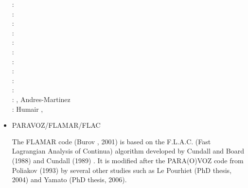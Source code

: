 \begin{itemize}
\begin{scriptsize}
\twothousandeight: \cite{daks08}\cite{scdk08}\\
\twothousandnine: \cite{gogk09}\\
\twothousandten: \cite{krda10}\cite{kaus10}\cite{dekc10}\\
\twothousandeleven: \cite{yakm11}\\
\twothousandtwelve: \cite{gebk12}\cite{rukb12}\cite{thka12}\\
\twothousandthirteen: \cite{scpo13}\\
\twothousandfourteen: \cite{jobk14}\\
\twothousandfifteen: \cite{lukz15}\cite{gehm15}\cite{thkp15}\cite{musd15}\\
\twothousandsixteen: \cite{jads16}\cite{maka16}\cite{cakp16}\\
\twothousandeighteen: \cite{dusd18}\cite{jasc18}\cite{jadg18}\cite{comj18}\cite{jens18}\cite{rabw18}\cite{chsm18}\\
\twothousandnineteen: \cite{sifg19}\cite{baba19}\cite{sogh19}, Andres-Martinez \etal \cite{anpa19}\\
\twothousandtwenty: Humair \etal \cite{hube20},
\end{scriptsize}

\item PARAVOZ/FLAMAR/FLAC 

The FLAMAR code (Burov \etal, 2001) is based on the
F.L.A.C. (Fast Lagrangian Analysis of Continua) algorithm developed by Cundall and Board (1988) 
and Cundall (1989) \cite{cund89}. It is modified after the PARA(O)VOZ code from 
Poliakov \etal (1993) \cite{pocp93} by several
other studies such as Le Pourhiet (PhD thesis, 2004) and Yamato (PhD thesis, 2006).


\end{itemize}

